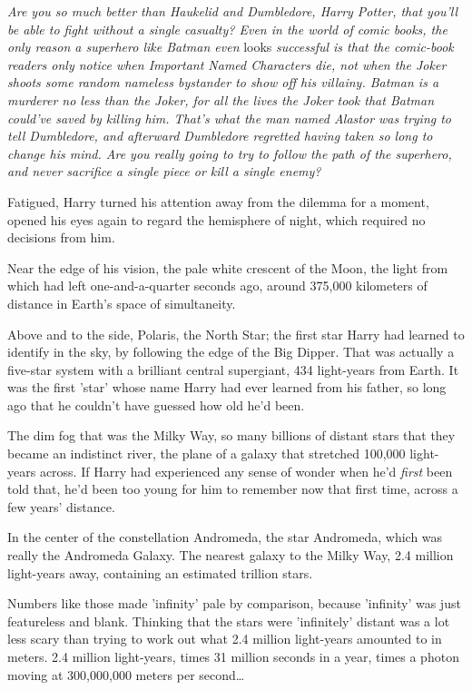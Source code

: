 \emph{Are you so much better than Haukelid and Dumbledore, Harry Potter, that 
you'll be able to fight without a single casualty? Even in the world of comic 
books, the only reason a superhero like Batman even} looks \emph{successful is 
that the comic-book readers only notice when Important Named Characters die, 
not when the Joker shoots some random nameless bystander to show off his 
villainy. Batman is a murderer no less than the Joker, for all the lives the 
Joker took that Batman could've saved by killing him. That's what the man named 
Alastor was trying to tell Dumbledore, and afterward Dumbledore regretted 
having taken so long to change his mind. Are you really going to try to follow 
the path of the superhero, and never sacrifice a single piece or kill a single 
enemy?}

Fatigued, Harry turned his attention away from the dilemma for a moment, opened 
his eyes again to regard the hemisphere of night, which required no decisions 
from him.

Near the edge of his vision, the pale white crescent of the Moon, the light 
from which had left one-and-a-quarter seconds ago, around 375,000 kilometers of 
distance in Earth's space of simultaneity.

Above and to the side, Polaris, the North Star; the first star Harry had 
learned to identify in the sky, by following the edge of the Big Dipper. That 
was actually a five-star system with a brilliant central supergiant, 434 
light-years from Earth. It was the first 'star' whose name Harry had ever 
learned from his father, so long ago that he couldn't have guessed how old he'd 
been.

The dim fog that was the Milky Way, so many billions of distant stars that they 
became an indistinct river, the plane of a galaxy that stretched 100,000 
light-years across. If Harry had experienced any sense of wonder when he'd 
\emph{first} been told that, he'd been too young for him to remember now that 
first time, across a few years' distance.

In the center of the constellation Andromeda, the star Andromeda, which was 
really the Andromeda Galaxy. The nearest galaxy to the Milky Way, 2.4 million 
light-years away, containing an estimated trillion stars.

Numbers like those made 'infinity' pale by comparison, because 'infinity' was 
just featureless and blank. Thinking that the stars were 'infinitely' distant 
was a lot less scary than trying to work out what 2.4 million light-years 
amounted to in meters. 2.4 million light-years, times 31 million seconds in a 
year, times a photon moving at 300,000,000 meters per second{\ldots}

